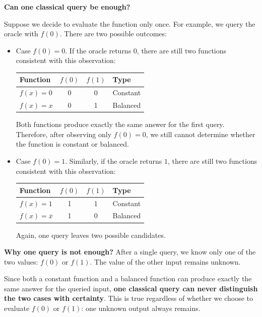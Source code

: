\highspace
\begin{flushleft}
    \textcolor{Green3}{ \textbf{Can one classical query be enough?}}
\end{flushleft}
Suppose we decide to evaluate the function only once. For example, we query the oracle with $f(0)$. There are two possible outcomes:
\begin{itemize}
    \item Case $f(0) = 0$. If the oracle returns $0$, there are still two functions consistent with this observation:
    \begin{center}
        \begin{tabular}{@{} l c c l @{}}
            \toprule
            \textbf{Function} & $f(0)$ & $f(1)$ & \textbf{Type} \\
            \midrule
            $f(x) = 0$ & 0 & 0 & Constant \\
            $f(x) = x$ & 0 & 1 & Balanced \\
            \bottomrule
        \end{tabular}
    \end{center}
    Both functions produce exactly the same answer for the first query. Therefore, after observing only $f(0) = 0$, we still cannot determine whether the function is constant or balanced.
    
    
    \item Case $f(0) = 1$. Similarly, if the oracle returns $1$, there are still two functions consistent with this observation:
    \begin{center}
        \begin{tabular}{@{} l c c l @{}}
            \toprule
            \textbf{Function} & $f(0)$ & $f(1)$ & \textbf{Type} \\
            \midrule
            $f(x) = 1$ & 1 & 1 & Constant \\
            $f(x) = \overline{x}$ & 1 & 0 & Balanced \\
            \bottomrule
        \end{tabular}
    \end{center}
    Again, one query leaves two possible candidates.
\end{itemize}
\textcolor{Red2}{ \textbf{Why one query is not enough?}} After a single query, we know only one of the two values: $f(0)$ or $f(1)$. The value of the other input remains unknown.

\highspace
Since both a constant function and a balanced function can produce exactly the same answer for the queried input, \textbf{one classical query can never distinguish the two cases with certainty}. This is true regardless of whether we choose to evaluate $f(0)$ or $f(1)$: one unknown output always remains.


